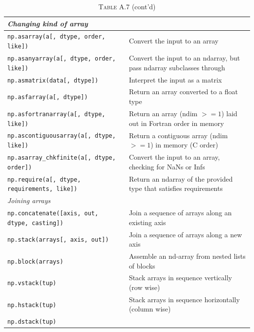 \documentclass[a4paper,11pt]{book}
\begin{document}
\begin{appendices}
\begin{table}
	\centering 
	\caption*{\textsc{Table A.7} (cont'd)}
	\begin{tabular}{p{7.5cm}p{13cm}}
		\midrule
		\multicolumn{1}{l}{\textit{Changing kind of array}} \\ 
		\midrule
                \texttt{np.asarray(a[, dtype, order, like])}&       
		Convert the input to an array\\
                \texttt{np.asanyarray(a[, dtype, order, like])}&
                Convert the input to an ndarray, but pass ndarray subclasses through\\
                \texttt{np.asmatrix(data[, dtype])}&
                Interpret the input as a matrix\\
                \texttt{np.asfarray(a[, dtype])}&
                Return an array converted to a float type\\
                \texttt{np.asfortranarray(a[, dtype, like])}&
                Return an array (ndim $>= 1$) laid out in Fortran order in memory\\
                \texttt{np.ascontiguousarray(a[, dtype, like])}&
                Return a contiguous array (ndim $>= 1$) in memory (C order)\\
                \texttt{np.asarray\_chkfinite(a[, dtype, order])}&
                Convert the input to an array, checking for NaNs or Infs\\
                \texttt{np.require(a[, dtype, requirements, like])}&
                Return an ndarray of the provided type that satisfies requirements\\
		\midrule
		\multicolumn{1}{l}{\textit{Joining arrays}} \\
		\midrule
                \texttt{np.concatenate([axis, out, dtype, casting])} &
                Join a sequence of arrays along an existing axis\\
                \texttt{np.stack(arrays[, axis, out])} &
                Join a sequence of arrays along a new axis\\
                \texttt{np.block(arrays)} &
                Assemble an nd-array from nested lists of blocks\\
                \texttt{np.vstack(tup)} &
                Stack arrays in sequence vertically (row wise)\\
                \texttt{np.hstack(tup)} &
                Stack arrays in sequence horizontally (column wise)\\
                \texttt{np.dstack(tup)} &

\end{tabular}
\end{table}
\end{appendices}
\end{document}
